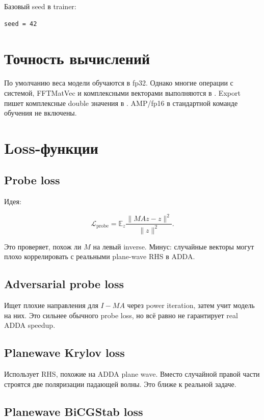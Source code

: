 \documentclass[11pt,a4paper,oneside]{book}
\newcommand{\code}[1]{\texttt{\detokenize{#1}}}
\begin{document}
Базовый seed в trainer:

\begin{lstlisting}
seed = 42
\end{lstlisting}

\section{Точность вычислений}

По умолчанию веса модели обучаются в fp32. Однако многие операции с системой,
FFTMatVec и комплексными векторами выполняются в \code{complex128}. Export
пишет комплексные double значения в \code{.precond}. AMP/fp16 в стандартной
команде обучения не включены.

\section{Loss-функции}

\subsection{Probe loss}

Идея:

\begin{equation}
  \mathcal{L}_{\mathrm{probe}} =
  \mathbb{E}_z
  \frac{\|M A z - z\|^2}{\|z\|^2}.
\end{equation}

Это проверяет, похож ли $M$ на левый inverse. Минус: случайные векторы могут
плохо коррелировать с реальными plane-wave RHS в ADDA.

\subsection{Adversarial probe loss}

Ищет плохие направления для $I-MA$ через power iteration, затем учит модель на
них. Это сильнее обычного probe loss, но всё равно не гарантирует real ADDA
speedup.

\subsection{Planewave Krylov loss}

Использует RHS, похожие на ADDA plane wave. Вместо случайной правой части
строятся две поляризации падающей волны. Это ближе к реальной задаче.

\subsection{Planewave BiCGStab loss}
\end{document}
